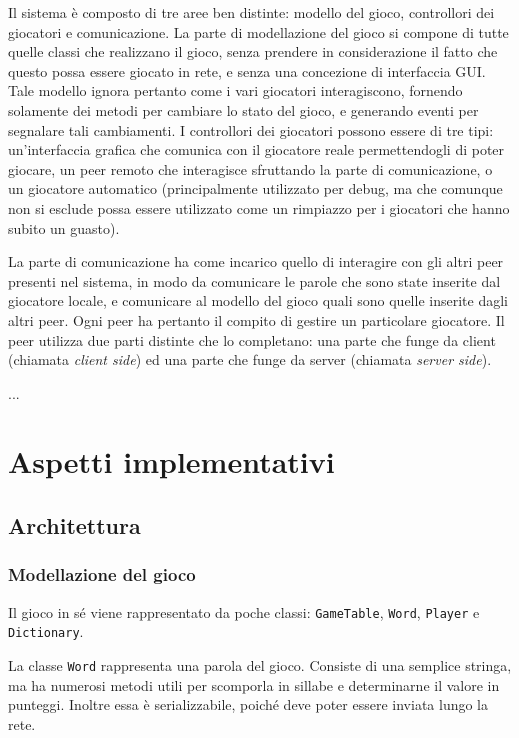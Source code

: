 \documentclass[10.5pt]{article}
\begin{document}
Il sistema è composto di tre aree ben distinte: modello del gioco, controllori dei giocatori e comunicazione. La parte di modellazione del gioco si compone di tutte quelle classi che realizzano il gioco, senza prendere in considerazione il fatto che questo possa essere giocato in rete, e senza una concezione di interfaccia GUI. Tale modello ignora pertanto come i vari giocatori interagiscono, fornendo solamente dei metodi per cambiare lo stato del gioco, e generando eventi per segnalare tali cambiamenti. I controllori dei giocatori possono essere di tre tipi: un'interfaccia grafica che comunica con il giocatore reale permettendogli di poter giocare, un peer remoto che interagisce sfruttando la parte di comunicazione, o un giocatore automatico (principalmente utilizzato per debug, ma che comunque non si esclude possa essere utilizzato come un rimpiazzo per i giocatori che hanno subito un guasto).

La parte di comunicazione ha come incarico quello di interagire con gli altri peer presenti nel sistema, in modo da comunicare le parole che sono state inserite dal giocatore locale, e comunicare al modello del gioco quali sono quelle inserite dagli altri peer. Ogni peer ha pertanto il compito di gestire un particolare giocatore. Il peer utilizza due parti distinte che lo completano: una parte che funge da client (chiamata \emph{client side}) ed una parte che funge da server (chiamata \emph{server side}). 

...


\section{Aspetti implementativi}

\subsection{Architettura}

\subsubsection{Modellazione del gioco}

Il gioco in sé viene rappresentato da poche classi: \texttt{GameTable}, \texttt{Word}, \texttt{Player} e \texttt{Dictionary}.

La classe \texttt{Word} rappresenta una parola del gioco. Consiste di una semplice stringa, ma ha numerosi metodi utili per scomporla in sillabe e determinarne il valore in punteggi. Inoltre essa è serializzabile, poiché deve poter essere inviata lungo la rete.  
\end{document}
